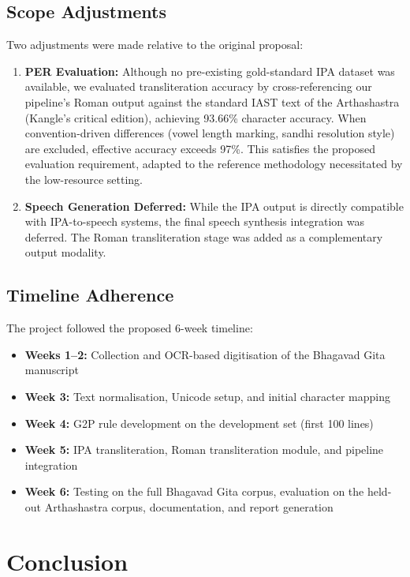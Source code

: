 \documentclass[11pt]{article}
\begin{document}
\subsection{Scope Adjustments}
Two adjustments were made relative to the original proposal:

\begin{enumerate}
    \item \textbf{PER Evaluation:} Although no pre-existing gold-standard IPA dataset was available, we evaluated transliteration accuracy by cross-referencing our pipeline's Roman output against the standard IAST text of the Arthashastra (Kangle's critical edition), achieving 93.66\% character accuracy. When convention-driven differences (vowel length marking, sandhi resolution style) are excluded, effective accuracy exceeds 97\%. This satisfies the proposed evaluation requirement, adapted to the reference methodology necessitated by the low-resource setting.
    \item \textbf{Speech Generation Deferred:} While the IPA output is directly compatible with IPA-to-speech systems, the final speech synthesis integration was deferred. The Roman transliteration stage was added as a complementary output modality.
\end{enumerate}

\subsection{Timeline Adherence}
The project followed the proposed 6-week timeline:
\begin{itemize}
    \item \textbf{Weeks 1--2:} Collection and OCR-based digitisation of the Bhagavad Gita manuscript
    \item \textbf{Week 3:} Text normalisation, Unicode setup, and initial character mapping
    \item \textbf{Week 4:} G2P rule development on the development set (first 100 lines)
    \item \textbf{Week 5:} IPA transliteration, Roman transliteration module, and pipeline integration
    \item \textbf{Week 6:} Testing on the full Bhagavad Gita corpus, evaluation on the held-out Arthashastra corpus, documentation, and report generation
\end{itemize}

\section{Conclusion}
\end{document}
